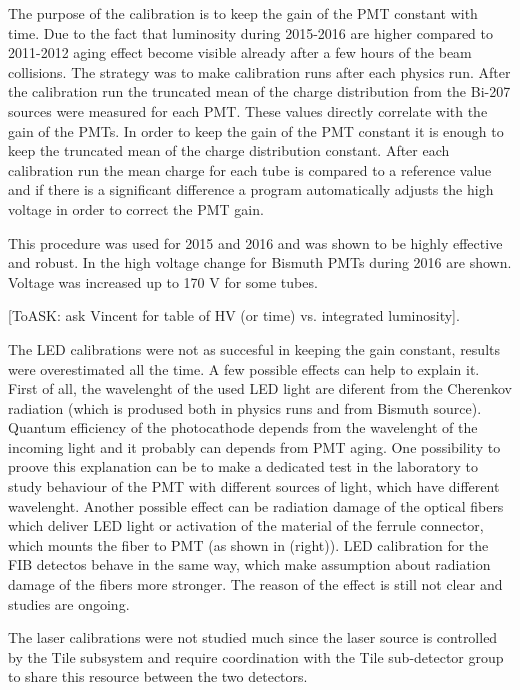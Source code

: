 The purpose of the calibration is to keep the gain of the PMT constant with time.
Due to the fact that luminosity during 2015-2016 are higher compared to 2011-2012
aging effect become visible already after a few hours of the beam collisions.
The strategy was to make calibration runs after each physics run.
After the calibration run the truncated mean of the charge distribution from the Bi-207 sources were measured for each PMT.
These values directly correlate with the gain of the PMTs. 
In order to keep the gain of the PMT constant it is enough to keep the truncated mean of the charge distribution constant.
After each calibration run the mean charge for each tube is compared to a reference value and if there is a significant difference a program 
automatically adjusts the high voltage in order to correct the PMT gain.

This procedure was used for 2015 and 2016 and was shown to be highly effective and robust.
In  the high voltage change for Bismuth PMTs during 2016 are shown. 
Voltage was increased up to 170 V for some tubes.

[ToASK: ask Vincent for table of HV (or time) vs. integrated luminosity].

The LED calibrations were not as succesful in keeping the gain constant, results were overestimated all the time.
A few possible effects can help to explain it. First of all, the wavelenght of the used LED light are diferent from the Cherenkov radiation 
(which is prodused both in physics runs and from Bismuth source).
Quantum efficiency of the photocathode depends from the wavelenght of the incoming light and it probably can depends from PMT aging.
One possibility to proove this explanation can be to make a dedicated test in the laboratory to study behaviour of the PMT with different sources of light, which have different wavelenght.
Another possible effect can be radiation damage of the optical fibers which deliver LED light or activation of the material of the ferrule connector, which mounts the fiber to PMT 
(as shown in  (right)). LED calibration for the FIB detectos behave in the same way, which make assumption about radiation damage of the fibers more stronger.
The reason of the effect is still not clear and studies are ongoing.

The laser calibrations were not studied much since the laser source is controlled by the Tile subsystem and require 
coordination with the Tile sub-detector group to share this resource between the two detectors.

